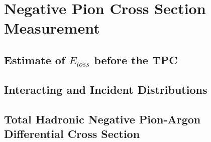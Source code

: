 \chapter{Negative Pion Cross Section Measurement}

\section{Estimate of $E_{loss}$ before the TPC}
\section{Interacting and Incident Distributions}

\section{Total Hadronic Negative Pion-Argon Differential Cross Section}

